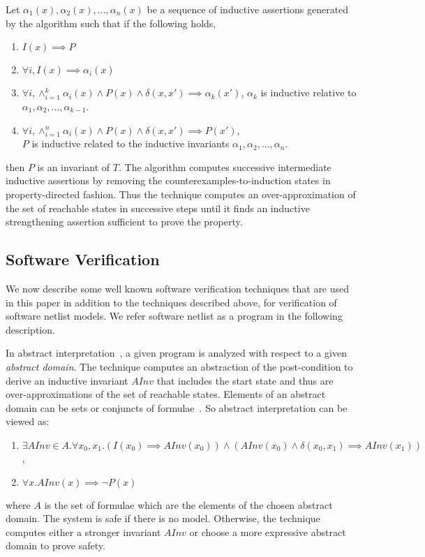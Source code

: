 %
Let $\alpha_1(x), \alpha_2(x),...,\alpha_n(x)$ be a sequence of 
inductive assertions generated by the algorithm such that if the 
following holds,
\begin{enumerate}
 \item $I(x) \implies P$
 \item $\forall i, I(x) \implies \alpha_i(x)$
 \item $\forall i, \wedge_{i=1}^{k} \alpha_i(x) \wedge P(x) \wedge \delta(x,x') \implies \alpha_k(x')$,
 $\alpha_k$ is inductive relative to $\alpha_1, \alpha_2, ...,\alpha_{k-1}$.
 \item $\forall i, \wedge_{i=1}^{n} \alpha_i(x) \wedge P(x) \wedge \delta(x,x') \implies P(x')$, \\
 $P$ is inductive related to the inductive invariants $\alpha_1, \alpha_2, ...,\alpha_n$.
\end{enumerate}
then $P$ is an invariant of $T$. The algorithm computes successive intermediate 
inductive assertions by removing the counterexamples-to-induction states in 
property-directed fashion.  Thus the technique computes an over-approximation 
of the set of reachable states in successive steps until it finds an 
inductive strengthening assertion sufficient to prove the property. 


\subsection{Software Verification}
%
We now describe some well known software verification techniques that are 
used in this paper in addition to the techniques described above, for 
verification of software netlist models.  We refer software 
netlist as a program in the following description. 
  
%
In abstract interpretation~\cite{DBLP:journals/corr/abs-cs-0701193,DBLP:conf/emsoft/Cousot07},
a given program is analyzed with respect to a given \emph{abstract domain}.  
The technique computes an abstraction of the post-condition to derive an 
inductive invariant $AInv$ that includes the start state and thus are 
over-approximations of the set of reachable states. Elements of an abstract 
domain can be sets or conjuncts of formulae~\cite{vmcai-2013}. So abstract 
interpretation can be viewed as:
\begin{enumerate}
\item  $\exists AInv \in A. \forall x_0, x_1. (I(x_0) \implies AInv(x_0)) 
\wedge (AInv(x_0) \wedge \delta(x_0, x_1) \implies AInv(x_1))$, 
\item $\forall x. AInv(x) \implies \neg{P(x)}$
\end{enumerate}
where $A$ is the set of formulae which are the elements of the 
chosen abstract domain. The system is safe if there is no model. 
Otherwise, the technique computes either a stronger invariant 
$AInv$ or choose a more expressive abstract domain to prove safety.

